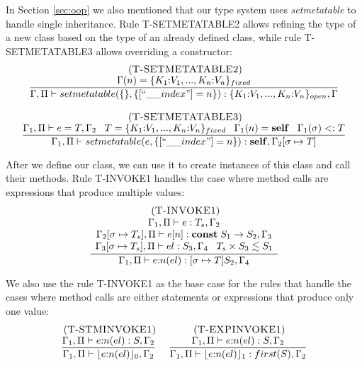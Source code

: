 In Section \ref{sec:oop} we also mentioned that our type system
uses \emph{setmetatable} to handle single inheritance.
Rule \textsc{T-SETMETATABLE2} allows refining the type of a new
class based on the type of an already defined class,
while rule \textsc{T-SETMETATABLE3} allows overriding a constructor:
\[
\begin{array}{c}
\begin{array}{c}
\mylabel{T-SETMETATABLE2}\\
\dfrac{\env(n) = \{K_{1}{:}V_{1}, ..., K_{n}{:}V_{n}\}_{fixed}}
      {\env, \penv \vdash setmetatable(\{\}, \{[``\string_\string_index"] = n\}):\{K_{1}{:}V_{1}, ..., K_{n}{:}V_{n}\}_{open}, \env}
\end{array}
\\ \\
\begin{array}{c}
\mylabel{T-SETMETATABLE3}\\
\dfrac{\env_{1}, \penv \vdash e = T, \env_{2} \;\;\;
       T = \{K_{1}{:}V_{1}, ..., K_{n}{:}V_{n}\}_{fixed} \;\;\;
       \env_{1}(n) = \Self \;\;\; \env_{1}(\sigma) \subtype T}
      {\env_{1}, \penv \vdash setmetatable(e, \{[``\string_\string_index"] = n\}):\Self, \env_{2}[\sigma \mapsto T]}
\end{array}
\end{array}
\]

After we define our class, we can use it to create instances
of this class and call their methods.
Rule \textsc{T-INVOKE1} handles the case where method calls
are expressions that produce multiple values:
\[
\begin{array}{c}
\; (\textsc{T-INVOKE1})\\
\dfrac{\begin{array}{c}
       \Gamma_{1}, \Pi \vdash e:T_{s}, \Gamma_{2}\\
       \Gamma_{2}[\sigma \mapsto T_{s}], \Pi \vdash e[n]:\mathbf{const} \; S_{1} \rightarrow S_{2}, \Gamma_{3}\\
       \Gamma_{3}[\sigma \mapsto T_{s}], \Pi \vdash el:S_{3}, \Gamma_{4} \;\;\;
       T_{s} \times S_{3} \lesssim S_{1}
       \end{array}}
      {\Gamma_{1}, \Pi \vdash e{:}n(el):[\sigma \mapsto T]S_{2}, \Gamma_{4}}
\end{array}
\]

We also use the rule \textsc{T-INVOKE1} as the base case for the rules
that handle the cases where method calls are either statements
or expressions that produce only one value:
\[
\begin{array}{c}
\begin{array}{c}
\; (\textsc{T-STMINVOKE1})\\
\dfrac{\Gamma_{1}, \Pi \vdash e{:}n(el):S, \Gamma_{2}}
      {\Gamma_{1}, \Pi \vdash \lfloor e{:}n(el) \rfloor_{0}, \Gamma_{2}}
\end{array}
\;
\begin{array}{c}
\; (\textsc{T-EXPINVOKE1})\\
\dfrac{\Gamma_{1}, \Pi \vdash e{:}n(el):S, \Gamma_{2}}
      {\Gamma_{1}, \Pi \vdash \lfloor e{:}n(el) \rfloor_{1}:first(S), \Gamma_{2}}
\end{array}
\end{array}
\]

